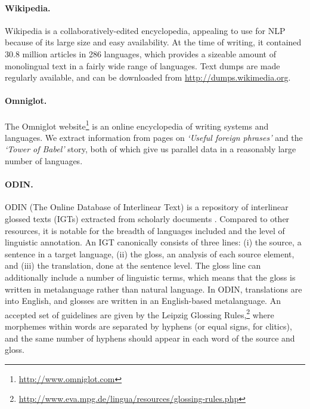 \paragraph{Wikipedia.}

Wikipedia is a collaboratively-edited encyclopedia, appealing to use for NLP because of its large size and easy availability. At the time of writing, it contained 30.8 million articles in 286 languages, which provides a sizeable amount of monolingual text in a fairly wide range of languages. Text dumps are made regularly available, and can be downloaded from \url{http://dumps.wikimedia.org}.

\paragraph{Omniglot.}

The Omniglot website\footnote{\url{http://www.omniglot.com}} is an online encyclopedia of writing systems and languages. We extract information from pages on \emph{`Useful foreign phrases'} and the \emph{`Tower of Babel'} story, both of which give us parallel data in a reasonably large number of languages. %

\paragraph{ODIN.} \label{sec:odin}

ODIN (The Online Database of Interlinear Text) is a repository of interlinear glossed texts (IGTs) extracted from scholarly documents \cite{lewis2006odin,lewis2010odin}.  Compared to other resources, it is notable for the breadth of languages included and the level of linguistic annotation.  An IGT canonically consists of three lines: (i) the source, a sentence in a target language, (ii) the gloss, an analysis of each source element, and (iii) the translation, done at the sentence level. The gloss line can additionally include a number of linguistic terms, which means that the gloss is written in metalanguage rather than natural language.  In ODIN, translations are into English, and glosses are written in an English-based metalanguage.  An accepted set of guidelines are given by the Leipzig Glossing Rules,\footnote{\url{http://www.eva.mpg.de/lingua/resources/glossing-rules.php}} where morphemes within words are separated by hyphens (or equal signs, for clitics), and the same number of hyphens should appear in each word of the source and gloss.

